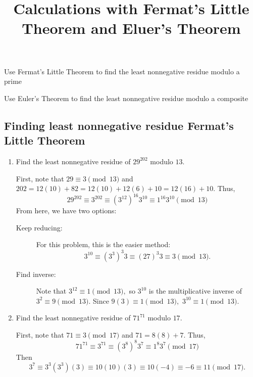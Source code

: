 \documentclass{ximera}
\title{Calculations with Fermat's Little Theorem and Eluer's Theorem}
\begin{document}
\begin{abstract}
\end{abstract}
\maketitle


\begin{obj}
  \item Use Fermat's Little Theorem to find the least nonnegative residue modulo a prime
  \item Use Euler's Theorem to find the least nonnegative residue modulo a composite
\end{obj}


\subsection*{Finding least nonnegative residue Fermat's Little Theorem}
\begin{example}
  \begin{enumerate}
    \item  Find the least nonnegative residue of $29^{202}$ modulo $13$. 
    
    First, note that $29\equiv 3\pmod{13}$ and $202=12(10)+82=12(10)+12(6)+10=12(16)+10.$  Thus,
    \[29^{202}\equiv3^{202}\equiv (3^{12})^{16}  3^{10}\equiv 1^{16} 3^{10}\pmod{13}\]
    From here,  we have two  options: 
    \begin{description}
      \item[Keep reducing:] For this problem, this is the easier method: 
        \[3^{10}\equiv (3^3)^3 3\equiv (27)^3 3\equiv 3\pmod{13}.\]
      \item[Find inverse:] Note that $3^{12}\equiv 1\pmod{13},$ so $3^{10}$ is the multiplicative inverse of $3^2\equiv 9\pmod{13}.$ Since $9(3)\equiv 1\pmod{13},$ $3^{10}\equiv 1\pmod{13}.$
    \end{description}

    \item Find the least nonnegative residue of $71^{71}$ modulo $17$. 

    First, note that $71\equiv 3\pmod{17}$ and $71=8(8)+7.$  Thus,
    \[71^{71}\equiv3^{71}\equiv (3^{8})^{8}  3^{7}\equiv 1^{8} 3^{7}\pmod{17}\]
    Then \[3^7\equiv 3^{3}(3^3)(3)\equiv 10(10)(3)\equiv 10(-4)\equiv -6\equiv 11\pmod{17}.\]
  \end{enumerate}
\end{example}
\end{document}
